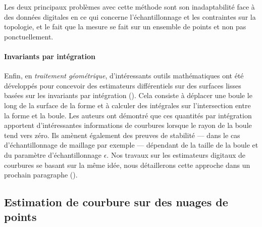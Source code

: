 Les deux principaux problèmes avec cette méthode sont son inadaptabilité face à
des données digitales en ce qui concerne l'échantillonnage et les contraintes
sur la topologie, et le fait que la mesure se fait sur un ensemble de
points et non pas ponctuellement.
%
\paragraph{Invariants par intégration}
%
Enfin, en \emph{traitement géométrique}, d'intéressants outils mathématiques ont
été développés pour concevoir des estimateurs différentiels sur des surfaces
lisses basées sur les invariants par intégration
(). Cela consiste à déplacer une
boule le long de la surface de la forme et à calculer des intégrales sur
l'intersection entre la forme et la boule. Les auteurs ont démontré que ces
quantités par intégration apportent d'intéressantes informations de courbures
lorsque le rayon de la boule tend vers zéro. Ils amènent également des preuves
de stabilité --- dans le cas d'échantillonnage de maillage par exemple ---
dépendant de la taille de la boule et du paramètre d'échantillonnage $\epsilon$.
Nos travaux sur les estimateurs digitaux de courbures se basant sur la même
idée, nous détaillerons cette approche dans un prochain paragraphe
().
%
\subsection{Estimation de courbure sur des nuages de points}
%
